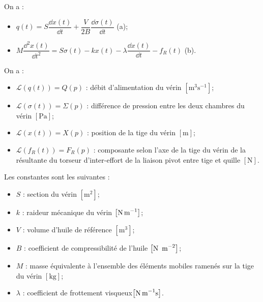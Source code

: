 \footnotesize
\begin{center}
\end{center}
\normalsize

On a : 
\begin{itemize}
\item $q(t)=S\dfrac{\dd x(t)}{ \dd t}+\dfrac{V}{2B}\dfrac{\dd \sigma(t)}{\dd t}$ (a);
\item $M\dfrac{\dd^2 x(t)}{\dd t^2} = S \sigma(t) - kx(t)-\lambda \dfrac{\dd x(t)}{\dd t} - f_R(t)$ (b).
\end{itemize}

On a :
\begin{itemize}
\item $\mathcal{L}\left(q(t)\right)=Q(p)$ : débit d’alimentation du vérin $\left[\text{m}^3\text{s}^{-1}\right]$;
\item $\mathcal{L}\left(\sigma(t)\right)=\Sigma(p)$ : différence de pression entre les deux chambres du vérin $\left[\text{Pa}\right]$;
\item $\mathcal{L}\left(x(t)\right)=X(p)$ : position de la tige du vérin $\left[\text{m}\right]$;
\item $\mathcal{L}\left(f_R(t)\right)=F_R(p)$ : composante selon l'axe de la tige du vérin de la résultante du torseur d'inter-effort de la liaison pivot entre tige et quille $\left[\text{N}\right]$.
\end{itemize}
Les constantes sont les suivantes :
\begin{itemize}
\item $S$ : section du vérin $\left[\text{m}^2\right]$;
\item $k$ : raideur mécanique du vérin $\left[\text{N\,m}^{-1}\right]$;
\item $V$ : volume d'huile de référence $\left[\text{m}^{3}\right]$;
\item $B$ : coefficient de compressibilité de l'huile $\left[\text{N\, m}^{-2}\right]$;
\item $M$ : masse équivalente à l'ensemble des éléments mobiles ramenés sur la tige du vérin $\left[\text{kg}\right]$;
\item $\lambda$ : coefficient de frottement visqueux$\left[\text{N\,m}^{-1}\text{s}\right]$.
\end{itemize} 

